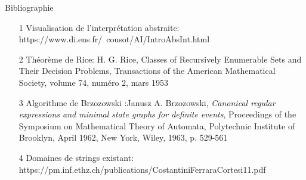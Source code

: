 \documentclass{beamer}
\begin{document}
\begin{frame}{Bibliographie}
  \begin{itemize}
    \item [1] Visualisation de l'interprétation abstraite:
    https://www.di.ens.fr/~cousot/AI/IntroAbsInt.html
    \item [2] Théorème de Rice: H. G. Rice, Classes of Recursively Enumerable Sets
    and Their Decision Problems, Transactions of the American Mathematical
    Society, volume 74, numéro 2, mars 1953
    \item [3] Algorithme de Brzozowski :Janusz A. Brzozowski, \emph{Canonical regular
    expressions and minimal state graphs for definite events}, Proceedings of the
    Symposium on Mathematical Theory of Automata, Polytechnic Institute of Brooklyn,
    April 1962, New York, Wiley, 1963, p. 529-561
    \item [4] Domaines de strings existant:
    https://pm.inf.ethz.ch/publications/CostantiniFerraraCortesi11.pdf
  \end{itemize}
\end{frame}
\end{document}
